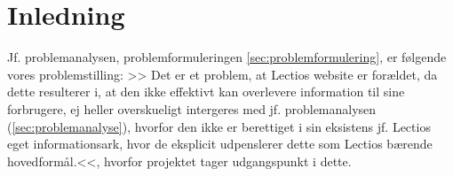 \section{Inledning}
Jf. problemanalysen, problemformuleringen \ref{sec:problemformulering}, er følgende vores problemstilling: >> Det er et problem, at Lectios website er forældet, da dette resulterer i, at den ikke effektivt kan overlevere information til sine forbrugere, ej heller overskueligt intergeres med jf. problemanalysen (\ref{sec:problemanalyse}), hvorfor den ikke er berettiget i sin eksistens jf. Lectios eget informationsark, hvor de eksplicit udpenslerer dette som Lectios bærende hovedformål\cite{lectioark}.<<, hvorfor projektet tager udgangspunkt i dette.